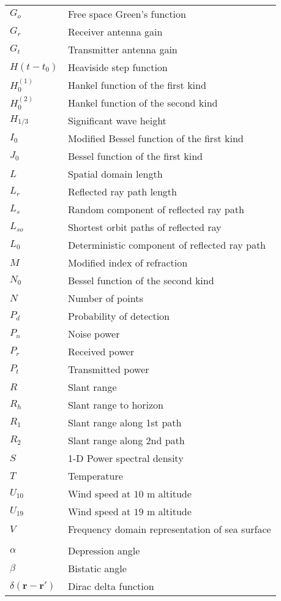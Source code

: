 \begin{supertabular}{ll}
$G_o$ & Free space Green's function \\
$G_r$ & Receiver antenna gain \\
$G_t$ & Transmitter antenna gain \\
$H(t-t_0)$ & Heaviside step function \\
$H_0^{(1)}$ & Hankel function of the first kind \\
$H_0^{(2)}$ & Hankel function of the second kind \\
$H_{1/3}$ & Significant wave height \\
$I_0$ & Modified Bessel function of the first kind \\
$J_0$ & Bessel function of the first kind \\
$L$ & Spatial domain length \\
$L_r$ & Reflected ray path length \\
$L_s$ & Random component of reflected ray path \\
$L_{so}$ & Shortest orbit paths of reflected ray \\
$L_0$ & Deterministic component of reflected ray path \\
$M$ & Modified index of refraction \\
$N_0$ & Bessel function of the second kind \\
$N$ & Number of points \\
$P_d$ & Probability of detection \\
$P_n$ & Noise power\\
$P_r$ & Received power \\
$P_t$ & Transmitted power \\
$R$ & Slant range \\
$R_h$ & Slant range to horizon \\
$R_1$ & Slant range along 1st path \\
$R_2$ & Slant range along 2nd path \\
$S$ & 1-D Power spectral density \\
$T$ & Temperature \\
$U_{10}$ & Wind speed at $10$ m altitude \\
$U_{19}$ & Wind speed at $19$ m altitude \\
$V$ & Frequency domain representation of sea surface\\
\\
$\alpha$ & Depression angle \\
$\beta$ & Bistatic angle \\
$\delta\left(\mathbf{r}-\mathbf{r}' \right)$ & Dirac delta function \\

\end{supertabular}
